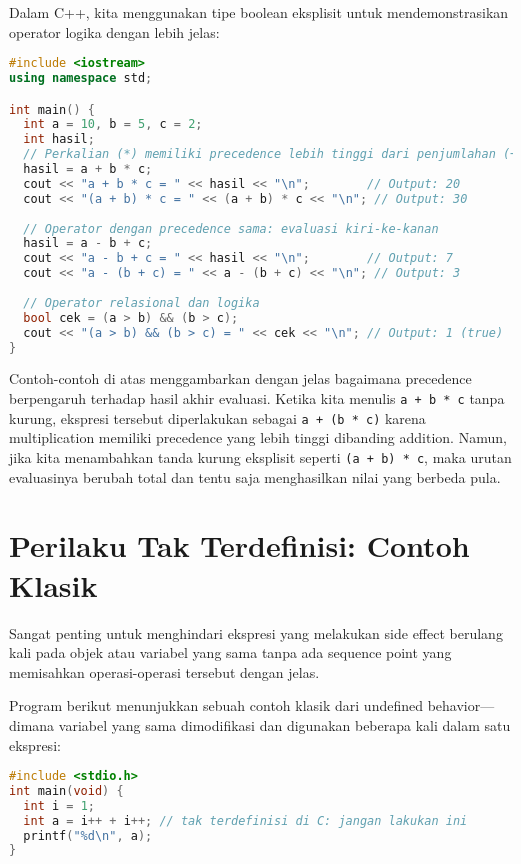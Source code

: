 \documentclass[../main.tex]{subfiles}
\begin{document}
Dalam C++, kita menggunakan tipe boolean eksplisit untuk mendemonstrasikan operator logika dengan lebih jelas:

\begin{lstlisting}[language=C++, caption={Precedence operator di C++}]
#include <iostream>
using namespace std;

int main() {
  int a = 10, b = 5, c = 2;
  int hasil;
  // Perkalian (*) memiliki precedence lebih tinggi dari penjumlahan (+)
  hasil = a + b * c;
  cout << "a + b * c = " << hasil << "\n";        // Output: 20
  cout << "(a + b) * c = " << (a + b) * c << "\n"; // Output: 30
  
  // Operator dengan precedence sama: evaluasi kiri-ke-kanan
  hasil = a - b + c;
  cout << "a - b + c = " << hasil << "\n";        // Output: 7
  cout << "a - (b + c) = " << a - (b + c) << "\n"; // Output: 3
  
  // Operator relasional dan logika
  bool cek = (a > b) && (b > c);
  cout << "(a > b) && (b > c) = " << cek << "\n"; // Output: 1 (true)
}
\end{lstlisting}

Contoh-contoh di atas menggambarkan dengan jelas bagaimana precedence berpengaruh terhadap hasil akhir evaluasi. Ketika kita menulis \texttt{a + b * c} tanpa kurung, ekspresi tersebut diperlakukan sebagai \texttt{a + (b * c)} karena multiplication memiliki precedence yang lebih tinggi dibanding addition. Namun, jika kita menambahkan tanda kurung eksplisit seperti \texttt{(a + b) * c}, maka urutan evaluasinya berubah total dan tentu saja menghasilkan nilai yang berbeda pula.

\section{Perilaku Tak Terdefinisi: Contoh Klasik}
Sangat penting untuk menghindari ekspresi yang melakukan side effect berulang kali pada objek atau variabel yang sama tanpa ada sequence point yang memisahkan operasi-operasi tersebut dengan jelas.

Program berikut menunjukkan sebuah contoh klasik dari undefined behavior—dimana variabel yang sama dimodifikasi dan digunakan beberapa kali dalam satu ekspresi:

\begin{lstlisting}[language=C, caption={Contoh UB: increment dan penggunaan berulang}]
#include <stdio.h>
int main(void) {
  int i = 1;
  int a = i++ + i++; // tak terdefinisi di C: jangan lakukan ini
  printf("%d\n", a);
}
\end{lstlisting}
\end{document}
